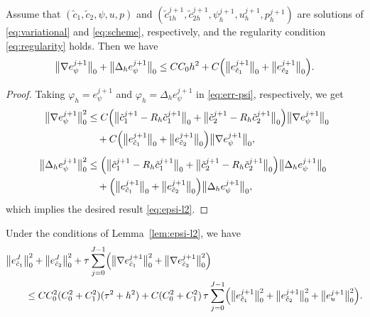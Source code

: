 \begin{lemma}\label{lem:epsi-l2}
Assume that $(\tilde{c}_{1},\tilde{c}_{2},\psi,u,p)$ and
$(\tilde{c}_{1h}^{j+1},\tilde{c}_{2h}^{j+1},\psi_{h}^{j+1},u_{h}^{j+1},p_{h}^{j+1})$
are solutions of \eqref{eq:variational} and \eqref{eq:scheme}, respectively, and the regularity
condition \eqref{eq:regularity} holds. Then we have
\begin{equation}\label{eq:epsi-l2}
  \bigl\|\nabla e_{\psi}^{j+1}\bigr\|_{0}
  + \bigl\|\Delta_{h} e_{\psi}^{j+1}\bigr\|_{0}
  \leq CC_{0}h^{2}
  + C\Bigl(\bigl\|e_{\tilde{c}_{1}}^{j+1}\bigr\|_{0}
           + \bigl\|e_{\tilde{c}_{2}}^{j+1}\bigr\|_{0}\Bigr).
\end{equation}
\end{lemma}

\begin{proof}
Taking $\varphi_{h} = e_{\psi}^{j+1}$ and $\varphi_{h} = \Delta_{h}e_{\psi}^{j+1}$
in \eqref{eq:err-psi}, respectively, we get
\begin{align}
  \bigl\|\nabla e_{\psi}^{j+1}\bigr\|_{0}^{2}
  &\leq C\Bigl(\bigl\|\tilde{c}_{1}^{j+1} - R_{h}\tilde{c}_{1}^{j+1}\bigr\|_{0}
              + \bigl\|\tilde{c}_{2}^{j+1} - R_{h}\tilde{c}_{2}^{j+1}\bigr\|_{0}\Bigr)
         \bigl\|\nabla e_{\psi}^{j+1}\bigr\|_{0} \nonumber\\
  &\quad + C\Bigl(\bigl\|e_{\tilde{c}_{1}}^{j+1}\bigr\|_{0}
                 + \bigl\|e_{\tilde{c}_{2}}^{j+1}\bigr\|_{0}\Bigr)
            \bigl\|\nabla e_{\psi}^{j+1}\bigr\|_{0},
  \label{eq:grad-epsi}\\[4pt]
  \bigl\|\Delta_{h}e_{\psi}^{j+1}\bigr\|_{0}^{2}
  &\leq \Bigl(\bigl\|\tilde{c}_{1}^{j+1} - R_{h}\tilde{c}_{1}^{j+1}\bigr\|_{0}
             + \bigl\|\tilde{c}_{2}^{j+1} - R_{h}\tilde{c}_{2}^{j+1}\bigr\|_{0}\Bigr)
        \bigl\|\Delta_{h}e_{\psi}^{j+1}\bigr\|_{0} \nonumber\\
  &\quad + \Bigl(\bigl\|e_{\tilde{c}_{1}}^{j+1}\bigr\|_{0}
                + \bigl\|e_{\tilde{c}_{2}}^{j+1}\bigr\|_{0}\Bigr)
           \bigl\|\Delta_{h}e_{\psi}^{j+1}\bigr\|_{0},
  \label{eq:Deltah-epsi}
\end{align}
which implies the desired result \eqref{eq:epsi-l2}.
\end{proof}

\begin{lemma}\label{lem:ec-l2}
Under the conditions of Lemma~\ref{lem:epsi-l2}, we have
\begin{align}
  &\bigl\|e_{\tilde{c}_{1}}^{J}\bigr\|_{0}^{2}
   + \bigl\|e_{\tilde{c}_{2}}^{J}\bigr\|_{0}^{2}
   + \tau\sum_{j=0}^{J-1}\Bigl(\bigl\|\nabla e_{\tilde{c}_{1}}^{j+1}\bigr\|_{0}^{2}
                               + \bigl\|\nabla e_{\tilde{c}_{2}}^{j+1}\bigr\|_{0}^{2}\Bigr)
  \nonumber\\
  &\qquad \leq CC_{0}^{2}(C_{0}^{2}+C_{1}^{2})(\tau^{2}+h^{2})
   + C(C_{0}^{2}+C_{1}^{2})\,\tau\sum_{j=0}^{J-1}
     \Bigl(\bigl\|e_{\tilde{c}_{1}}^{j+1}\bigr\|_{0}^{2}
          + \bigl\|e_{\tilde{c}_{2}}^{j+1}\bigr\|_{0}^{2}
          + \bigl\|e_{u}^{j+1}\bigr\|_{0}^{2}\Bigr).
  \label{eq:ec-l2}
\end{align}
\end{lemma}


